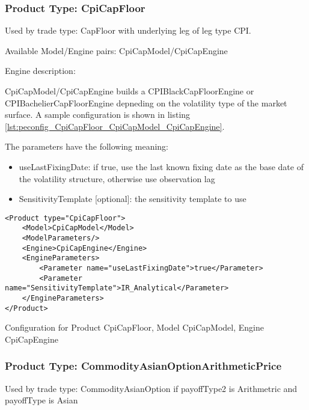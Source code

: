 \subsubsection{Product Type: CpiCapFloor}

Used by trade type: CapFloor with underlying leg of leg type CPI.

Available Model/Engine pairs: CpiCapModel/CpiCapEngine

Engine description:

CpiCapModel/CpiCapEngine builds a CPIBlackCapFloorEngine or CPIBachelierCapFloorEngine depneding on the volatility type
of the market surface. A sample configuration is shown in listing
\ref{lst:peconfig_CpiCapFloor_CpiCapModel_CpiCapEngine}.

The parameters have the following meaning:

\begin{itemize}
\item useLastFixingDate: if true, use the last known fixing date as the base date of the volatility structure, otherwise
  use observation lag
\item SensitivityTemplate [optional]: the sensitivity template to use 
\end{itemize}

\begin{longlisting}
\begin{verbatim}
<Product type="CpiCapFloor">
    <Model>CpiCapModel</Model>
    <ModelParameters/>
    <Engine>CpiCapEngine</Engine>
    <EngineParameters>
        <Parameter name="useLastFixingDate">true</Parameter>
        <Parameter name="SensitivityTemplate">IR_Analytical</Parameter>
    </EngineParameters>
</Product>
\end{verbatim}
\caption{Configuration for Product CpiCapFloor, Model CpiCapModel, Engine CpiCapEngine}
\label{lst:peconfig_CpiCapFloor_CpiCapModel_CpiCapEngine}
\end{longlisting}

\subsubsection{Product Type: CommodityAsianOptionArithmeticPrice}

Used by trade type: CommodityAsianOption if payoffType2 is Arithmetric and payoffType is Asian


